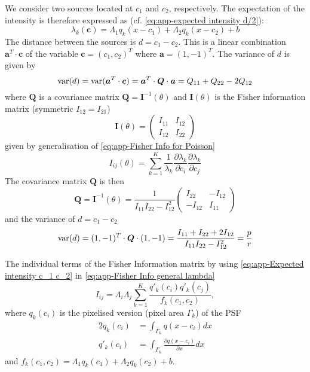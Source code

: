 We consider two sources located at $c_1$ and $c_2$, respectively. The expectation of the intensity is therefore expressed as (cf. \autoref{eq:app-expected intensity d/2}):
%
\begin{equation}
	\lambda_k(\bm{c})=\Lambda_1q_k(x-c_1)+\Lambda_2q_k(x-c_2)+b
	\label{eq:app-Expected intensity c_1 c_2}
\end{equation}
%
The distance between the sources is $d=c_1-c_2$. This is a linear combination $\bm{a}^T\cdot\bm{c}$ of the variable $\bm{c}=(c_1,c_2)^T$ where $\bm{a}=(1,-1)^T$. The variance of $d$ is given by 
%
\begin{equation}
	\mathrm{var}(d)=\mathrm{var}(\bm{a}^T\cdot\bm{c})=\bm{a}^T\cdot\bm{Q}\cdot\bm{a}=Q_{11}+Q_{22}-2Q_{12}
\end{equation}
%
where $\bm{Q}$ is a covariance matrix $\bm{Q}=\bm{I}^{-1}(\theta)$ and $\bm{I}(\theta)$ is the Fisher information matrix (symmetric
$I_{12}=I_{21}$)
%
\begin{equation}
	\bm{I}(\theta)=\left(
	\begin{array}{cc}
		I_{11} & I_{12}\\
		I_{12} & I_{22}
	\end{array}\right)
\end{equation}
%
given by generalisation of \autoref{eq:app-Fisher Info for Poisson}
%
\begin{equation}
	I_{ij}(\theta)=\sum_{k=1}^K\frac{1}{\lambda_k}\frac{\partial\lambda_k}{\partial c_i}\frac{\partial\lambda_k}{\partial c_j}
	\label{eq:app-Fisher Info general lambda}
\end{equation}
%
The covariance matrix $\bm{Q}$ is then 
%
\begin{equation}
	\bm{Q}=\bm{I}^{-1}(\theta)=\frac{1}{I_{11}I_{22}-I_{12}^2}\left(
	\begin{array}{cc}
		I_{22} & -I_{12}\\
		-I_{12} & I_{11}
	\end{array}\right)
\end{equation}
%
and the variance of $d=c_1-c_2$ 
%
\begin{equation}
	\mathrm{var}(d)=(1,-1)^T\cdot\bm{Q}\cdot(1,-1)=\frac{I_{11}+I_{22}+2I_{12}}{I_{11}I_{22}-I_{12}^2}=\frac{p}{r}
	\label{eq:app-variance alternative}
\end{equation}

The individual terms of the Fisher Information matrix by using \autoref{eq:app-Expected intensity c_1 c_2} in \autoref{eq:app-Fisher Info general lambda}
%
\begin{equation}
	I_{ij} =\Lambda_i\Lambda_j\sum_{k=1}^K\frac{q'_k(c_i)q'_k(c_j)}{f_k(c_1,c_2)},
	\label{eq:app-Fisher Information alternative - Individual}
\end{equation}
%
where $q_k(c_i)$ is the pixelised version (pixel area $\Gamma_k$) of the PSF
%
\begin{alignat*}{2}
	q_k(c_i) & =\int_{\Gamma_k}q(x-c_i)dx\\
	q'_k(c_i) & =\int_{\Gamma_k}\frac{\partial q(x-c_i)}{\partial x}dx
\end{alignat*}
%
and $f_k(c_1,c_2)=\Lambda_1q_k(c_1)+\Lambda_2q_k(c_2)+b$.
 
